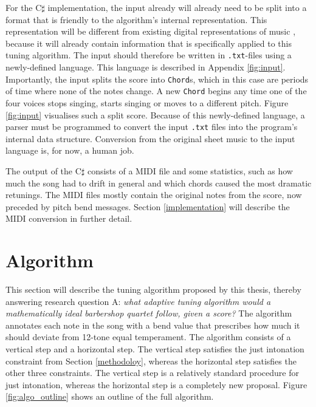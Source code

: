 \documentclass[a4paper]{article}
\begin{document}
For the C$\sharp$ implementation, the input already will already need to be split into a format that is friendly to the algorithm's internal representation. This representation will be different from existing digital representations of music \cite{midi_manufacturers_association_complete_2014, de_haas_music_2012, hsiao_compound_2021}, because it will already contain information that is specifically applied to this tuning algorithm. The input should therefore be written in \texttt{.txt}-files using a newly-defined language. This language is described in Appendix \ref{fig:input}. Importantly, the input splits the score into \texttt{Chord}s, which in this case are periods of time where none of the notes change. A new \texttt{Chord} begins any time one of the four voices stops singing, starts singing or moves to a different pitch. Figure \ref{fig:input} visualises such a split score. Because of this newly-defined language, a parser must be programmed to convert the input \texttt{.txt} files into the program's internal data structure. Conversion from the original sheet music to the input language is, for now, a human job.

The output of the C$\sharp$ consists of a MIDI file \cite{midi_manufacturers_association_complete_2014} and some statistics, such as how much the song had to drift in general and which chords caused the most dramatic retunings. The MIDI files mostly contain the original notes from the score, now preceded by pitch bend messages. Section \ref{implementation} will describe the MIDI conversion in further detail.


\section{Algorithm}
\label{algorithm}
This section will describe the tuning algorithm proposed by this thesis, thereby answering research question A: {\it what adaptive tuning algorithm would a mathematically ideal barbershop quartet follow, given a score?} The algorithm annotates each note in the song with a bend value that prescribes how much it should deviate from 12-tone equal temperament. The algorithm consists of a vertical step and a horizontal step. The vertical step satisfies the just intonation constraint from Section \ref{methodoloy}, whereas the horizontal step satisfies the other three constraints. The vertical step is a relatively standard procedure for just intonation, whereas the horizontal step is a completely new proposal. Figure \ref{fig:algo_outline} shows an outline of the full algorithm.
\end{document}
